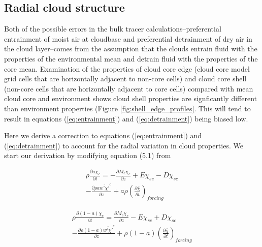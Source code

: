 \documentclass[12pt]{article}
\begin{document}

\subsection{Radial cloud structure}

Both of the possible errors in the bulk tracer calculations--preferential
entrainment of moist air at cloudbase and preferential detrainment of dry air
in the cloud layer--comes from the assumption that the clouds entrain fluid
with the properties of the environmental mean and detrain fluid with the
properties of the core mean.  Examination of the properties of cloud core edge
(cloud core model grid cells that are horizontally adjacent to non-core cells)
and cloud core shell (non-core cells that are horizontally adjacent to core
cells) compared with mean cloud core and environment shows cloud shell
properties are signficantly different than environment properties (Figure 
\ref{fig:shell_edge_profiles}.  This will tend to result in equations 
(\ref{eq:entrainment}) and (\ref{eq:detrainment}) being biased low.  

Here we derive a correction to equations (\ref{eq:entrainment}) and 
(\ref{eq:detrainment}) to account for the radial variation in cloud properties.
We start our derivation by modifying equation (5.1) from \cite{Siebesma1995}

\begin{equation}
  \label{eq:derivation_entrainment}
  \begin{split}
    \rho \frac{\partial a \chi_c}{\partial t} 
    = - \frac{\partial M_c \chi_c}{\partial z} 
    + E \chi_{se} - D \chi_{sc} \\
    - \frac{\partial \rho a \overline{w' \chi'}^c}{\partial z} 
    + a \rho \left(\frac{\partial \bar{\chi}}{\partial t}\right)_{forcing}
  \end{split}
\end{equation}

\begin{equation}
  \label{eq:derivation_detrainment}
  \begin{split}
    \rho \frac{\partial (1 - a) \chi_e}{\partial t}
    = \frac{\partial M_c \chi_e}{\partial z} 
    - E \chi_{se} + D \chi_{sc} \\
    - \frac{\partial \rho (1 - a) \overline{w' \chi'}^e}{\partial z} 
    + \rho (1 - a) \left(\frac{\partial \bar{\chi}}{\partial t}\right)_{forcing}
  \end{split}
\end{equation}
\end{document}
